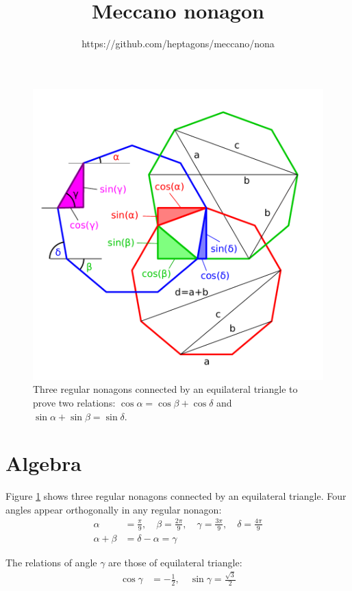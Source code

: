 \documentclass[11pt]{article}
\title{\textbf{Meccano nonagon}}
\author{https://github.com/heptagons/meccano/nona}
\date{}
\begin{document}
\maketitle

\begin{figure}[h]
\centering
\includegraphics[scale=0.7]{figs/3nonagons}
\caption{Three regular nonagons connected by an equilateral triangle to prove two relations:
$\cos\alpha=\cos\beta+\cos\delta$ and $\sin\alpha+\sin\beta=\sin\delta$.}
\label{fig:nonagons}
\end{figure}

\section{Algebra}

Figure \ref{fig:nonagons} shows three regular nonagons connected by an equilateral 
triangle. Four angles appear orthogonally in any regular nonagon:
\begin{align}
\alpha &= \frac{\pi}{9}, \quad \beta = \frac{2\pi}{9}, 
 \quad \gamma = \frac{3\pi}{9}, \quad \delta = \frac{4\pi}{9} \\
\alpha + \beta &= \delta - \alpha = \gamma
\end{align}

The relations of angle $\gamma$ are those of equilateral triangle:
\begin{align}
\cos\gamma &= -\frac{1}{2}, \quad \sin\gamma = \frac{\sqrt{3}}{2}
\end{align}
\end{document}
